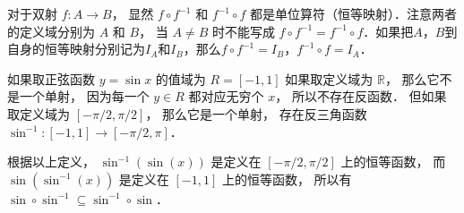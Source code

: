 对于双射 $f:A\to B$， 显然 $f\circ f^{-1}$ 和 $f^{-1}\circ f$ 都是单位算符（恒等映射）．注意两者的定义域分别为 $A$ 和 $B$， 当 $A \ne B$ 时不能写成 $f\circ f^{-1} = f^{-1}\circ f$．如果把$A$，$B$到自身的恒等映射分别记为$I_A$和$I_B$，那么$f\circ f^{-1}=I_B$，$f^{-1}\circ f=I_A$．

\begin{example}{}
如果取正弦函数 $y = \sin x$ 的值域为 $R = [-1, 1]$ 如果取定义域为 $\mathbb R$，  那么它不是一个单射， 因为每一个 $y \in R$ 都对应无穷个 $x$， 所以不存在反函数． 但如果取定义域为 $[-\pi/2, \pi/2]$， 那么它是一个单射， 存在反三角函数 $\sin^{-1}: [-1, 1] \to [-\pi/2, \pi]$．

根据以上定义， $\sin^{-1} (\sin(x))$ 是定义在 $[-\pi/2, \pi/2]$ 上的恒等函数， 而 $\sin (\sin^{-1}(x))$ 是定义在 $[-1, 1]$ 上的恒等函数， 所以有 $\sin \circ \sin^{-1} \subseteq \sin^{-1} \circ \sin$．
\end{example}
